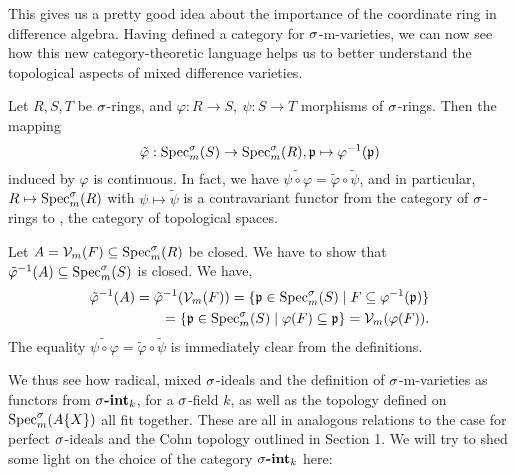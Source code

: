 This gives us a pretty good idea about the importance of the coordinate ring in difference algebra.
Having defined a category for $\sigma$-m-varieties, we can now see how this new category-theoretic language helps us to better understand the topological aspects of mixed difference varieties.

\begin{lem}\label{inducedcont}
Let $R,S,T$ be $\sigma$-rings, and $\varphi: R \rightarrow S,~ \psi: S \rightarrow T$ morphisms of $\sigma$-rings. Then the mapping $$\tilde \varphi: \operatorname{Spec}^\sigma_m(S) \rightarrow \operatorname{Spec}^\sigma_m(R), \mathfrak{p} \mapsto \varphi^{-1}(\mathfrak{p})$$ 
induced by $\varphi$ is continuous. 
In fact, we have $\widetilde{ \psi \circ \varphi} = \tilde \varphi \circ \tilde \psi$, and in particular, $R \mapsto \operatorname{Spec}^\sigma_m(R)$ with $\psi \mapsto\tilde \psi$ is a contravariant functor from the category of $\sigma$-rings to \Top, the category of topological spaces.
\begin{bew}
Let $A = \mathcal{V}_m(F) \subseteq \operatorname{Spec}^\sigma_m(R)$ be closed. We have to show that $\tilde \varphi^{-1}(A) \subseteq \operatorname{Spec}^\sigma_m(S)$ is closed.
We have, 
\begin{align*} \tilde \varphi^{-1}(A) = \tilde \varphi^{-1}(\mathcal{V}_m(F)) = \{ \mathfrak{p} \in \operatorname{Spec}^\sigma_m(S) \mid F \subseteq \varphi^{-1}(\mathfrak{p}) \} \\ = \{\mathfrak{p} \in \operatorname{Spec}^\sigma_m(S) \mid \varphi(F) \subseteq \mathfrak{p} \} = \mathcal{V}_m(\varphi(F)). \end{align*}
The equality $\widetilde{ \psi \circ \varphi} = \tilde \varphi \circ \tilde \psi$ is immediately clear from the definitions.
\end{bew}
\end{lem}

We thus see how radical, mixed $\sigma$-ideals and the definition of $\sigma$-m-varieties as functors from $\sigma\text{{\normalfont\textbf{-int}}}_k$, for a $\sigma$-field $k$, as well as the topology defined on $\operatorname{Spec}^\sigma_m(A\{X\})$ all fit together. 
These are all in analogous relations to the case for perfect $\sigma$-ideals and the Cohn topology outlined in Section 1. We will try to shed some light on the choice of the category $\sigma\text{{\normalfont\textbf{-int}}}_k$ here:

